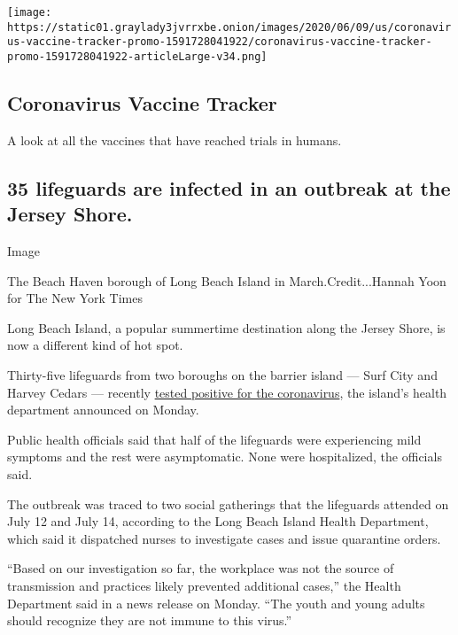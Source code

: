 \href{https://www.nytimes3xbfgragh.onion/interactive/2020/science/coronavirus-vaccine-tracker.html}{}

\texttt{[image: https://static01.graylady3jvrrxbe.onion/images/2020/06/09/us/coronavirus-vaccine-tracker-promo-1591728041922/coronavirus-vaccine-tracker-promo-1591728041922-articleLarge-v34.png]}

\hypertarget{coronavirus-vaccine-tracker}{%
\subsection{Coronavirus Vaccine
Tracker}\label{coronavirus-vaccine-tracker}}

A look at all the vaccines that have reached trials in humans.

\hypertarget{35-lifeguards-are-infected-in-an-outbreak-at-the-jersey-shore}{%
\subsection{35 lifeguards are infected in an outbreak at the Jersey
Shore.}\label{35-lifeguards-are-infected-in-an-outbreak-at-the-jersey-shore}}

Image

The Beach Haven borough of Long Beach Island in March.Credit...Hannah
Yoon for The New York Times

Long Beach Island, a popular summertime destination along the Jersey
Shore, is now a different kind of hot spot.

Thirty-five lifeguards from two boroughs on the barrier island --- Surf
City and Harvey Cedars --- recently
\href{http://lbihealth.com/wp-content/uploads/2020/07/pressrelease727.pdf}{tested
positive for the coronavirus}, the island's health department announced
on Monday.

Public health officials said that half of the lifeguards were
experiencing mild symptoms and the rest were asymptomatic. None were
hospitalized, the officials said.

The outbreak was traced to two social gatherings that the lifeguards
attended on July 12 and July 14, according to the Long Beach Island
Health Department, which said it dispatched nurses to investigate cases
and issue quarantine orders.

``Based on our investigation so far, the workplace was not the source of
transmission and practices likely prevented additional cases,'' the
Health Department said in a news release on Monday. ``The youth and
young adults should recognize they are not immune to this virus.''

